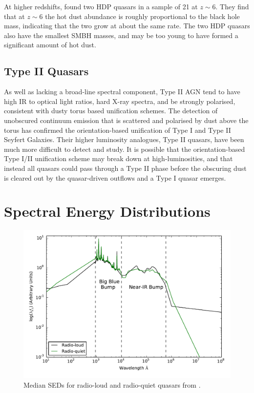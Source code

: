 At higher redshifts, \citet{jiang10} found two HDP quasars in a sample of 21 at $z\sim6$. They find that at $z\sim6$ the hot dust abundance is roughly proportional to the black hole mass, indicating that the two grow at about the same rate. The two HDP quasars also have the smallest SMBH masses, and may be too young to have formed a significant amount of hot dust.

\subsection{Type II Quasars}

As well as lacking a broad-line spectral component, Type II AGN tend to have high IR to optical light ratios, hard X-ray spectra, and be strongly polarised, consistent with dusty torus based unification schemes. The detection of unobscured continuum emission that is scattered and polarised by dust above the torus has confirmed the orientation-based unification of Type I and Type II Seyfert Galaxies. Their higher luminosity analogues, Type II quasars, have been much more difficult to detect and study. It is possible that the orientation-based Type I/II unification scheme may break down at high-luminosities, and that instead all quasars could pass through a Type II phase before the obscuring dust is cleared out by the quasar-driven outflows and a Type I quasar emerges.  

\section{Spectral Energy Distributions}
\label{sec:sed}

\begin{figure}
  \centering
  \includegraphics[width=\textwidth]{figures/chapter06/shangsed}
  \caption{Median SEDs for radio-loud and radio-quiet quasars from \citet{shang11}.}
  \label{fig:seyfert_sed}
\end{figure}

